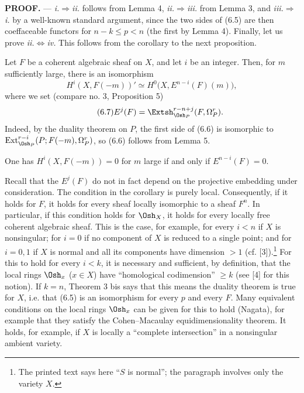 \noindent\textbf{PROOF.} --- \textit{i.}$\Rightarrow$\textit{ii.} follows
from Lemma 4, \textit{ii.}$\Rightarrow$\textit{iii.} from Lemma 3, and
\textit{iii.}$\Rightarrow$\textit{i.} by a well-known standard argument, since
the two sides of (6.5) are then coeffaceable functors for $n-k\leq p<n$ (the
first by Lemma 4). Finally, let us prove
\textit{ii.}$\Leftrightarrow$\textit{iv.} This follows from the corollary to the
next proposition.

 Let $F$ be a coherent algebraic sheaf on $X$, and let
$i$ be an integer. Then, for $m$ sufficiently large, there is an isomorphism
\begin{equation}\tag{6.6}
  H^{i}(X,F(-m))'
  \simeq H^{0}\bigl(X,E^{n-i}(F)(m)\bigr),
\end{equation}
where we set (compare no. 3, Proposition 5)
\begin{equation}\tag{6.7}
  E^{j}(F)=\Extsh_{\Osh_P}^{r-n+j}(F,\Omega_P^{r}).
\end{equation}
Indeed, by the duality theorem on $P$, the first side of (6.6) is isomorphic to
$\operatorname{Ext}_{\Osh_P}^{r-i}(P;F(-m),\Omega_P^{r})$, so (6.6) follows
from Lemma 5.

 One has $H^{i}(X,F(-m))=0$ for $m$ large if and only if
$E^{n-i}(F)=0$.

Recall that the $E^{j}(F)$ do not in fact depend on the projective embedding
under consideration. The condition in the corollary is purely local.
Consequently, if it holds for $F$, it holds for every sheaf locally isomorphic
to a sheaf $F^{n}$. In particular, if this condition holds for $\Osh_X$, it
holds for every locally free coherent algebraic sheaf. This is the case, for
example, for every $i<n$ if $X$ is nonsingular; for $i=0$ if no component of
$X$ is reduced to a single point; and for $i=0,1$ if $X$ is normal and all its
components have dimension $>1$ (cf. [3]).\footnote{The printed text says here
``$S$ is normal''; the paragraph involves only the variety $X$.} For this to
hold for every $i<k$, it is necessary and sufficient, by definition, that the
local rings $\Osh_x$ ($x\in X$) have ``homological codimension'' $\geq k$ (see
[4] for this notion). If $k=n$, Theorem 3 bis says that this means the duality
theorem is true for $X$, i.e. that (6.5) is an isomorphism for every $p$ and
every $F$. Many equivalent conditions on the local rings $\Osh_x$ can be given
for this to hold (Nagata), for example that they satisfy the Cohen--Macaulay
equidimensionality theorem. It holds, for example, if $X$ is locally a
``complete intersection'' in a nonsingular ambient variety.

